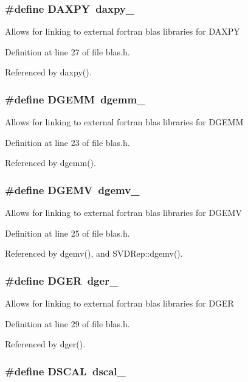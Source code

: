 \subsubsection{\setlength{\rightskip}{0pt plus 5cm}\#define DAXPY~daxpy\_\-}\label{blas_8h_04405c8e3f71edff5932cd0554170d89_04405c8e3f71edff5932cd0554170d89}


Allows for linking to external fortran blas libraries for DAXPY 

Definition at line 27 of file blas.h.

Referenced by daxpy().
\subsubsection{\setlength{\rightskip}{0pt plus 5cm}\#define DGEMM~dgemm\_\-}\label{blas_8h_b51496c68627956ebc2ccfa50213de6e_b51496c68627956ebc2ccfa50213de6e}


Allows for linking to external fortran blas libraries for DGEMM 

Definition at line 23 of file blas.h.

Referenced by dgemm().
\subsubsection{\setlength{\rightskip}{0pt plus 5cm}\#define DGEMV~dgemv\_\-}\label{blas_8h_0260f2947c854f207136ede761890269_0260f2947c854f207136ede761890269}


Allows for linking to external fortran blas libraries for DGEMV 

Definition at line 25 of file blas.h.

Referenced by dgemv(), and SVDRep::dgemv().
\subsubsection{\setlength{\rightskip}{0pt plus 5cm}\#define DGER~dger\_\-}\label{blas_8h_1eebfea4174d2a5fc4682b6ada0c1d79_1eebfea4174d2a5fc4682b6ada0c1d79}


Allows for linking to external fortran blas libraries for DGER 

Definition at line 29 of file blas.h.

Referenced by dger().
\subsubsection{\setlength{\rightskip}{0pt plus 5cm}\#define DSCAL~dscal\_\-}\label{blas_8h_6a2c73c1de2d591e1bcc37cb4ecef141_6a2c73c1de2d591e1bcc37cb4ecef141}



